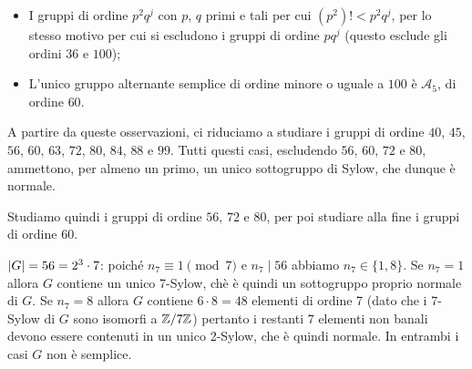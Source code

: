 \documentclass[11pt]{scrartcl}
\begin{document}
\begin{itemize}
		$p! < p q^j$, in quanto, per il Teorema di Poincaré, esiste un sottogruppo
		non banale e normale $N$ di $G$ tale per cui $p \mid \abs{N} \mid p! < p q^j$
		e contenuto in un $q$-Sylow di $G$ (questo esclude gli ordini $12$, $18$, $24$, $48$, $50$, $54$, $75$, $96$ e $98$);
		\item I gruppi di ordine $p^2 q^j$ con $p$, $q$ primi e tali per cui
		$(p^2)! < p^2 q^j$, per lo stesso motivo per cui si escludono i gruppi
		di ordine $p q^j$ (questo esclude gli ordini $36$ e $100$);
		\item L'unico gruppo alternante semplice di ordine minore o uguale a $100$ è $\mathcal{A}_5$, di ordine $60$.
	\end{itemize}
	
	A partire da queste osservazioni, ci riduciamo a studiare i gruppi di ordine $40$, $45$, $56$, $60$, $63$, $72$, $80$, $84$, $88$ e $99$. Tutti questi casi,
	escludendo $56$, $60$, $72$ e $80$, ammettono, per almeno un primo, un unico
	sottogruppo di Sylow, che dunque è normale. \medskip
	
	
	Studiamo quindi i gruppi di ordine $56$, $72$ e $80$, per poi studiare
	alla fine i gruppi di ordine $60$. \medskip
	
	\underline{$\left\lvert G \right\rvert = 56 = 2^3\cdot 7$}: poiché $n_7 \equiv 1 \pmod 7$ e $n_7 \mid 56$ abbiamo
	$n_7 \in \{1, 8\}$. Se $n_7 = 1$ allora $G$ contiene un unico 7-Sylow, chè 
	è quindi un sottogruppo proprio normale di $G$. Se $n_7 = 8$ allora $G$ contiene
	$6\cdot8 = 48$ elementi di ordine 7 (dato che i 7-Sylow di $G$ sono isomorfi a $\mathbb{Z}/{7}\mathbb{Z}$)
	pertanto i restanti $7$ elementi non banali devono essere contenuti in un 
	unico 2-Sylow, che è quindi normale. In entrambi i casi $G$ non è semplice.
	\newline\newline
	
\end{document}
